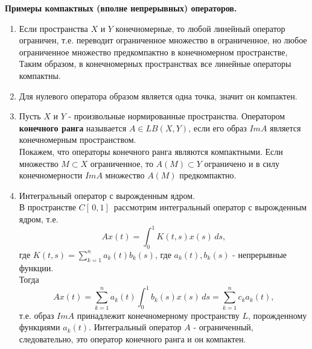 \bigbreak
\textbf{Примеры компактных (вполне непрерывных) операторов.}
\begin{enumerate}
    \item Если пространства $X$ и $Y$ конечномерные, то любой линейный оператор ограничен, т.е. переводит ограниченное множество в ограниченное, но любое ограниченное множество предкомпактно в конечномерном пространстве, Таким образом, в конечномерных пространствах все линейные операторы компактны.

    \item Для нулевого оператора образом является одна точка, значит он компактен.

    \item Пусть $X$ и $Y$ - произвольные нормированные пространства. Оператором \textbf{конечного ранга} называется $A \in LB(X,Y)$, если его образ $Im A$ является конечномерным пространством. \\
    Покажем, что операторы конечного ранга являются компактными. Если множество $M \subset X$ ограниченное, то $A(M) \subset Y$ ограничено и в силу конечномерности $Im A$ множество $A(M)$ предкомпактно.

    \item Интегральный оператор с вырожденным ядром. \\
    В пространстве $C[\,0,1]\,$ рассмотрим интегральный оператор с вырожденным ядром, т.е.
    $$
        Ax(t) = \int_0^1 K(t,s)x(s) \, ds,
    $$
    где $K(t,s) = \sum_{k=1}^n a_k(t)b_k(s)$, где $a_k(t), b_k(s)$ - непрерывные функции. \\
    Тогда
    $$
         Ax(t) = \sum_{k=1}^n a_k(t) \int_0^1 b_k(s)x(s) \, ds = \sum_{k=1}^n c_k a_k(t),
    $$
    т.е. образ $Im A$ принадлежит конечномерному пространству $L$, порожденному функциями $a_k(t)$. Интегральный оператор $A$ - ограниченный, следовательно, это оператор конечного ранга и он компактен.
\end{enumerate}

